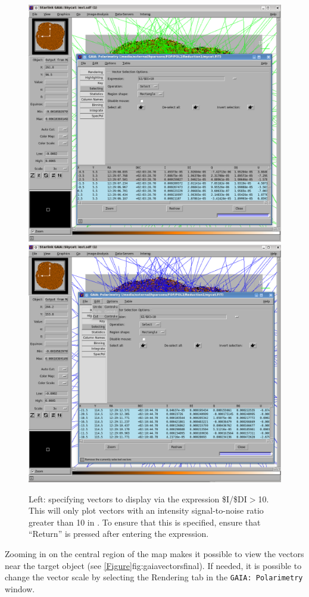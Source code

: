 \begin{figure}[t!]
\begin{center}
\includegraphics[width=0.46\linewidth]{sc22-gaia-plot-vectors-4.png}
\includegraphics[width=0.46\linewidth]{sc22-gaia-plot-vectors-6.png}
\caption [Selecting Vectors in GAIA]{Left: specifying vectors
  to display via the expression \$I/\$DI$>$10. This will only plot
  vectors with an intensity signal-to-noise
  ratio greater than 10 in \GAIA. To ensure that this is specified,
  ensure that ``Return'' is pressed after entering the expression.
}
\label{fig:gaiavectorssecond}
\end{center}
\end{figure}

Zooming in on the central region of the map makes it possible to view
the vectors near the target object (see \cref{Figure}{fig:gaiavectorsfinal}{}).
If needed, it is possible to change the vector scale by selecting the Rendering
tab in the \texttt{GAIA: Polarimetry} window.


